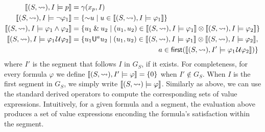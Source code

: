 \small
\begin{align*}
	\llbracket (S, {\hb}), I \models p \rrbracket &= \gamma(x_p, I) \\
	\llbracket (S, {\hb}), I \models \lnot \varphi_1 \rrbracket &= \{\BitNeg u \st u \in  \llbracket (S, {\hb}), I \models \varphi_1 \rrbracket \} \\
	\llbracket (S, {\hb}), I \models \varphi_1 \land \varphi_2 \rrbracket &= \{ u_1 \BitAnd u_2 \st (u_1, u_2) \in \llbracket (S, {\hb}), I \models \varphi_1 \rrbracket \otimes \llbracket (S, {\hb}), I \models \varphi_2 \rrbracket  \} \\
	\llbracket (S, {\hb}), I \models \varphi_1 \until \varphi_2 \rrbracket &= \{ u_1 \mathsf{U}^a u_2 \st (u_1, u_2) \in \llbracket (S, {\hb}), I \models \varphi_1 \rrbracket \otimes \llbracket (S, {\hb}), I \models \varphi_2 \rrbracket, \\
	 &\hspace{12.2em} a \in \first(\llbracket (S, {\hb}), I' \models \varphi_1 \until \varphi_2 \rrbracket) \}
\end{align*}
\normalsize
where $I'$ is the segment that follows $I$ in $G_S$, if it exists.
For completeness, for every formula $\varphi$ we define $\llbracket (S, {\rightsquigarrow}), I' \models \varphi \rrbracket = \{0\}$ when $I' \notin G_S$.
When $I$ is the first segment in $G_S$, we simply write $\llbracket (S, {\rightsquigarrow}) \models \varphi \rrbracket$.
Similarly as above, we can use the standard derived operators to compute the corresponding sets of value expressions.
Intuitively, for a given formula and a segment, the evaluation above produces a set of value expressions enconding the formula's satisfaction within the segment.

